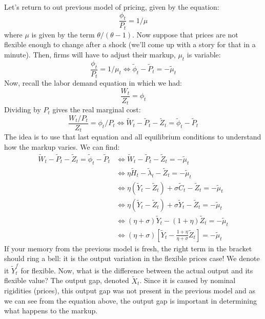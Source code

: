 \documentclass[12pt]{report}
\begin{document}
Let's return to out previous model of pricing, given by the equation: $$\frac{\phi_t}{P_t} = 1/\mu $$ where $\mu$ is given by the term $\theta/(\theta - 1)$. Now suppose that prices are not flexible enough to change after a shock (we'll come up with a story for that in a minute). Then, firms will have to adjust their markup, $\mu_t$ is variable: $$ \frac{\phi_t}{P_t} = 1/\mu_t \Leftrightarrow \tilde \phi_t - \tilde P_t = - \tilde \mu_t $$ Now, recall the labor demand equation in which we had: $$\frac{W_t}{Z_t} = \phi_{t}$$ Dividing by $P_t$ gives the real marginal cost: $$ \frac{W_t/P_t}{Z_t} = \phi_{t}/P_t \Leftrightarrow \tilde W_t - \tilde P_t - \tilde Z_t = \tilde \phi_t - \tilde P_t $$ The idea is to use that last equation and all equilibrium conditions to understand how the markup varies. We can find: \begin{align*}
\tilde W_t - \tilde P_t - \tilde Z_t = \tilde \phi_t - \tilde P_t & \Leftrightarrow \tilde W_t - \tilde P_t - \tilde Z_t = - \tilde \mu_t \\
& \Leftrightarrow \eta \tilde H_t - \tilde \lambda_t - \tilde Z_t = - \tilde \mu_t \\
& \Leftrightarrow \eta (\tilde Y_t - \tilde Z_t) + \sigma \tilde C_t - \tilde Z_t = - \tilde \mu_t \\
& \Leftrightarrow \eta (\tilde Y_t - \tilde Z_t) + \sigma \tilde Y_t - \tilde Z_t = - \tilde \mu_t \\
& \Leftrightarrow (\eta + \sigma) \tilde Y_t - (1 + \eta) \tilde Z_t = - \tilde \mu_t \\
& \Leftrightarrow (\eta + \sigma) \left [ \tilde Y_t - \frac{1 + \eta}{\eta + \sigma} \tilde Z_t\right] = - \tilde \mu_t 
\end{align*} If your memory from the previous model is fresh, the right term in the bracket should ring a bell: it is the output variation in the flexible prices case! We denote it $\tilde Y_t^f$ for flexible. Now, what is the difference between the actual output and its flexible value? The output gap, denoted $\tilde X_t$. Since it is caused by nominal rigidities (prices), this output gap was not present in the previous model and as we can see from the equation above, the output gap is important in determining what happens to the markup.
\end{document}
